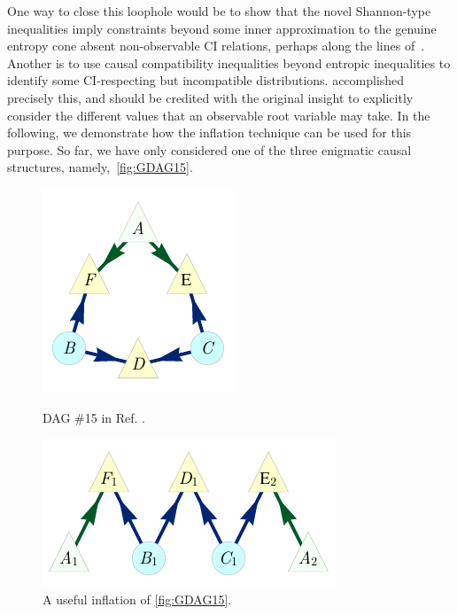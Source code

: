 {One way to close this loophole would be to show that the novel Shannon-type inequalities imply constraints beyond some inner approximation to the genuine entropy cone absent non-observable CI relations, perhaps along the lines of~\cite{weilenmann2016entropic}. Another is to use causal compatibility inequalities beyond entropic inequalities to identify some CI-respecting but incompatible distributions. \citet{pianaar2016interesting} accomplished precisely this, and should be credited with the original insight to explicitly consider the different values that an observable root variable may take. In the following, we demonstrate how the inflation technique can be used for this purpose. So far, we have only considered one of the three enigmatic causal structures, namely,~\cref{fig:GDAG15}.

\begin{figure}[b]
\centering
\begin{minipage}[t]{0.4\linewidth}
\centering
\includegraphics[scale=1]{scen15DAGV2.pdf}
\caption{DAG \#15 in Ref. \cite{pusey2014gdag}.}\label{fig:GDAG15}
\end{minipage}
\hfill
\begin{minipage}[t]{0.5\linewidth}
\centering
\includegraphics[scale=1]{scen15InflationDAGV2.pdf}
\caption{A useful inflation of \cref{fig:GDAG15}.}\label{fig:Inflated15}
\end{minipage}
\end{figure}

}
